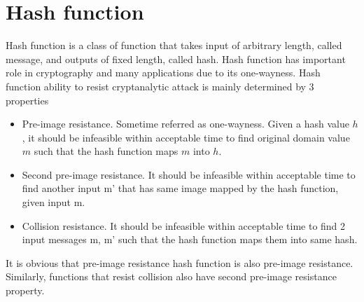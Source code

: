 \chapter{Hash function}
Hash function is a class of function that takes input of arbitrary length, called message, and outputs of fixed length, called hash. Hash function has important role in cryptography and many applications due to its one-wayness. Hash function ability to resist cryptanalytic attack is mainly determined by 3 properties
\begin{itemize}
    \item Pre-image resistance. Sometime referred as one-wayness. Given a hash value $h$, it should be infeasible within acceptable time to find original domain value $m$ such that the hash function maps $m$ into $h$.
    \item Second pre-image resistance. It should be infeasible within acceptable time to find another input m’ that has same image mapped by the hash function, given input m.
    \item Collision resistance. It should be infeasible within acceptable time to find 2 input messages m, m’ such that the hash function maps them into same hash.
\end{itemize}

It is obvious that pre-image resistance hash function is also pre-image resistance. Similarly, functions that resist collision also have second pre-image resistance property.